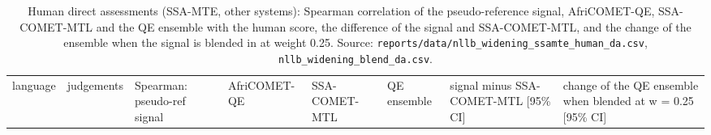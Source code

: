 \begin{table}[t]
\centering
\footnotesize
\setlength{\tabcolsep}{3pt}
\caption{Human direct assessments (SSA-MTE, other systems): Spearman correlation of the pseudo-reference signal, AfriCOMET-QE, SSA-COMET-MTL and the QE ensemble with the human score, the difference of the signal and SSA-COMET-MTL, and the change of the ensemble when the signal is blended in at weight 0.25. Source: \texttt{reports/data/nllb\_widening\_ssamte\_human\_da.csv}, \texttt{nllb\_widening\_blend\_da.csv}.}
\label{tab:t_nllb_widen_da}
{\def\LTcaptype{none} %
\begin{tabular}{@{}
  >{\raggedright\arraybackslash}p{}
  >{\raggedleft\arraybackslash}p{}
  >{\raggedleft\arraybackslash}p{}
  >{\raggedleft\arraybackslash}p{}
  >{\raggedleft\arraybackslash}p{}
  >{\raggedleft\arraybackslash}p{}
  >{\raggedleft\arraybackslash}p{}
  >{\raggedleft\arraybackslash}p{}@{}}
\toprule
\begin{minipage}[b]{\linewidth}\raggedright
language
\end{minipage} & \begin{minipage}[b]{\linewidth}\raggedleft
judgements
\end{minipage} & \begin{minipage}[b]{\linewidth}\raggedleft
Spearman: pseudo-ref signal
\end{minipage} & \begin{minipage}[b]{\linewidth}\raggedleft
AfriCOMET-QE
\end{minipage} & \begin{minipage}[b]{\linewidth}\raggedleft
SSA-COMET-MTL
\end{minipage} & \begin{minipage}[b]{\linewidth}\raggedleft
QE ensemble
\end{minipage} & \begin{minipage}[b]{\linewidth}\raggedleft
signal minus SSA-COMET-MTL {[}95\% CI{]}
\end{minipage} & \begin{minipage}[b]{\linewidth}\raggedleft
change of the QE ensemble when blended at w = 0.25 {[}95\% CI{]}
\end{minipage} \\

\end{tabular}}
\end{table}
